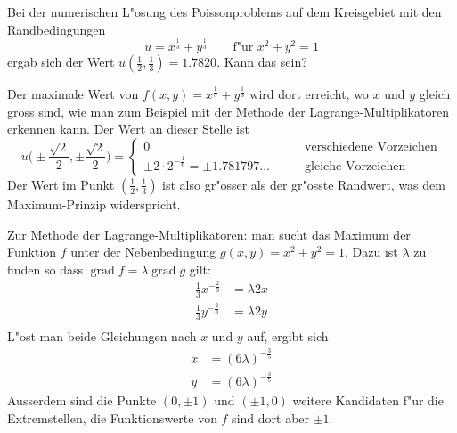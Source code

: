 Bei der numerischen L"osung des Poissonproblems auf dem Kreisgebiet
mit den Randbedingungen
\[
u= x^{\frac13}+y^{\frac13}\qquad \text{f"ur $x^2+y^2=1$}
\]
ergab sich der Wert $u(\frac12,\frac13)=1.7820$.  Kann das sein?

\begin{loesung}
Der maximale Wert von
$f(x,y)= x^{\frac13}+y^{\frac13}$
wird dort erreicht, wo $x$ und $y$
gleich gross sind, wie man zum Beispiel mit der Methode der
Lagrange-Multiplikatoren erkennen kann. Der Wert an dieser Stelle
ist
\[
u\biggl(
\pm\frac{\sqrt{2}}2
,
\pm\frac{\sqrt{2}}2
\biggr)
=\begin{cases}
0
&\qquad\text{verschiedene Vorzeichen}\\
\pm 2\cdot 2^{-\frac16}=\pm1.781797\dots
&\qquad\text{gleiche Vorzeichen}
\end{cases}
\]
Der Wert im Punkt $(\frac12,\frac13)$ ist also gr"osser als
der gr"osste Randwert, was dem Maximum-Prinzip widerspricht.

Zur Methode der Lagrange-Multiplikatoren: man sucht das Maximum der
Funktion $f$ unter der Nebenbedingung $g(x,y)=x^2+y^2=1$.
Dazu ist $\lambda$ zu finden so dass
$\operatorname{grad}f=\lambda\operatorname{grad}g$
gilt:
\begin{align*}
\frac13x^{-\frac23}&=\lambda 2x\\
\frac13y^{-\frac23}&=\lambda 2y\\
\end{align*}
L"ost man beide Gleichungen nach $x$ und $y$ auf, ergibt sich
\begin{align*}
x&=(6\lambda)^{-\frac35}\\
y&=(6\lambda)^{-\frac35}
\end{align*}
Ausserdem sind die Punkte $(0,\pm 1)$ und $(\pm 1,0)$ weitere
Kandidaten f"ur die Extremstellen, die Funktionswerte von $f$ sind dort
aber $\pm 1$.
\end{loesung}
